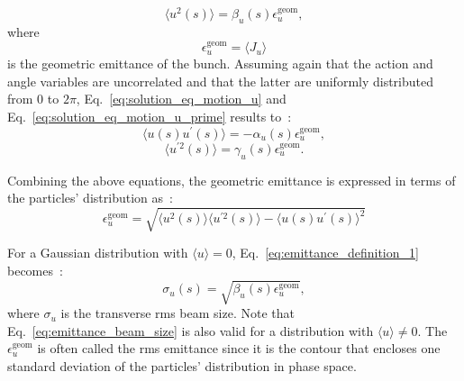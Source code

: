  \begin{equation}\label{eq:emittance_definition_1} %
     \langle u^2(s) \rangle = \beta_u(s)  \epsilon^{\mathrm{geom}}_u,
 \end{equation}
 where
 \begin{equation}\label{eq:geom_emittance_action}
     \epsilon^{\mathrm{geom}}_u=\langle J_u \rangle
 \end{equation}
 is the geometric emittance of the bunch. Assuming again that the action and angle variables are uncorrelated and that the latter are uniformly distributed from 0 to $2\pi$, Eq.~\eqref{eq:solution_eq_motion_u} and Eq.~\eqref{eq:solution_eq_motion_u_prime} results to~\cite{wolski2014}:
 \begin{equation}\label{eq:u_uprime_eq_1}
     \langle u(s) u^\prime(s) \rangle = - \alpha_u(s) \epsilon^{\mathrm{geom}}_u,
 \end{equation}
 \begin{equation}\label{eq:u_uprime_eq_2}
     \langle u^{\prime 2}(s) \rangle = \gamma_u(s) \epsilon^{\mathrm{geom}}_u.
 \end{equation}
 
 Combining the above equations, the geometric emittance is expressed in terms of the particles' distribution as~\cite{wolski2014}:
 \begin{equation}\label{eq:geometric_emittance_v2_co_zero}
     \epsilon^{\mathrm{geom}}_u = \sqrt{\langle u^2(s) \rangle \langle u^{\prime 2}(s) \rangle- \langle u (s)u^{\prime}(s) \rangle ^2}
 \end{equation}
 
For a Gaussian distribution with $\langle u \rangle=0$, Eq.~\eqref{eq:emittance_definition_1} becomes~\cite{wolski2014}: 
\begin{equation}\label{eq:emittance_beam_size}
    \sigma_u(s) = \sqrt{\beta_u(s) \epsilon^{\mathrm{geom}}_u},
\end{equation}
where $\sigma_u$ is the transverse rms beam size. Note that Eq.~\eqref{eq:emittance_beam_size} is also valid for a distribution with $\langle u \rangle \neq 0$. The $\epsilon^{\mathrm{geom}}_u$ is often called the rms emittance since it is the contour that encloses one standard deviation of the particles' distribution in phase space.

